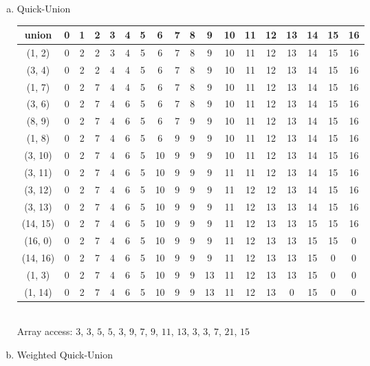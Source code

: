 \documentclass{article}\usepackage{amsmath,amssymb,amsthm,tikz,tkz-graph,color,chngpage,soul,hyperref,csquotes,graphicx,floatrow}\newcommand*{\QEDB}{\hfill\ensuremath{\square}}\newtheorem*{prop}{Proposition}\renewcommand{\theenumi}{\alph{enumi}}\usepackage[shortlabels]{enumitem}\usepackage[nobreak=true]{mdframed}\usetikzlibrary{matrix,calc}\MakeOuterQuote{"}\usepackage[margin=0.75in]{geometry} \newtheorem{theorem}{Theorem}
\begin{document}
\begin{mdframed}
\begin{enumerate}[a.]
\item Quick-Union \\
\begin{tabular}{|c|c|c|c|c|c|c|c|c|c|c|c|c|c|c|c|c|c|}
\hline
union & 0 &1 & 2 & 3 & 4 & 5 & 6 & 7 & 8 & 9 & 10 & 11 & 12 & 13 & 14 & 15 & 16 \\
\hline
(1, 2) & 0 & 2 & 2 & 3 & 4 & 5 & 6 & 7 & 8 & 9 & 10 & 11 & 12 & 13 & 14 & 15 & 16 \\
\hline
(3, 4) & 0 & 2 & 2 & 4 & 4 & 5 & 6 & 7 & 8 & 9 & 10 & 11 & 12 & 13 & 14 & 15 & 16 \\
\hline
(1, 7) & 0 & 2 & 7 & 4 & 4 & 5 & 6 & 7 & 8 & 9 & 10 & 11 & 12 & 13 & 14 & 15 & 16 \\
\hline
(3, 6) & 0 & 2 & 7 & 4 & 6 & 5 & 6 & 7 & 8 & 9 & 10 & 11 & 12 & 13 & 14 & 15 & 16 \\
\hline
(8, 9) & 0 & 2 & 7 & 4 & 6 & 5 & 6 & 7 & 9 & 9 & 10 & 11 & 12 & 13 & 14 & 15 & 16 \\
\hline
(1, 8) & 0 & 2 & 7 & 4 & 6 & 5 & 6 & 9 & 9 & 9 & 10 & 11 & 12 & 13 & 14 & 15 & 16 \\
\hline
(3, 10) & 0 & 2 & 7 & 4 & 6 & 5 & 10 & 9 & 9 & 9 & 10 & 11 & 12 & 13 & 14 & 15 & 16 \\
\hline
(3, 11) & 0 & 2 & 7 & 4 & 6 & 5 & 10 & 9 & 9 & 9 & 11 & 11 & 12 & 13 & 14 & 15 & 16 \\
\hline
(3, 12) & 0 & 2 & 7 & 4 & 6 & 5 & 10 & 9 & 9 & 9 & 11 & 12 & 12 & 13 & 14 & 15 & 16 \\
\hline
(3, 13) & 0 & 2 & 7 & 4 & 6 & 5 & 10 & 9 & 9 & 9 & 11 & 12 & 13 & 13 & 14 & 15 & 16 \\
\hline
(14, 15) & 0 & 2 & 7 & 4 & 6 & 5 & 10 & 9 & 9 & 9 & 11 & 12 & 13 & 13 & 15 & 15 & 16 \\
\hline
(16, 0) & 0 & 2 & 7 & 4 & 6 & 5 & 10 & 9 & 9 & 9 & 11 & 12 & 13 & 13 & 15 & 15 & 0 \\
\hline
(14, 16) & 0 & 2 & 7 & 4 & 6 & 5 & 10 & 9 & 9 & 9 & 11 & 12 & 13 & 13 & 15 & 0 & 0 \\
\hline
(1, 3) & 0 & 2 & 7 & 4 & 6 & 5 & 10 & 9 & 9 & 13 & 11 & 12 & 13 & 13 & 15 & 0 & 0 \\
\hline
(1, 14) & 0 & 2 & 7 & 4 & 6 & 5 & 10 & 9 & 9 & 13 & 11 & 12 & 13 & 0 & 15 & 0 & 0 \\
\hline
\end{tabular}
\\ Array access: $3$, $3$, $5$, $5$, $3$, $9$, $7$, $9$, $11$, $13$, $3$, $3$, $7$, $21$, $15$
\item Weighted Quick-Union \\

\end{enumerate}
\end{mdframed}
\end{document}
